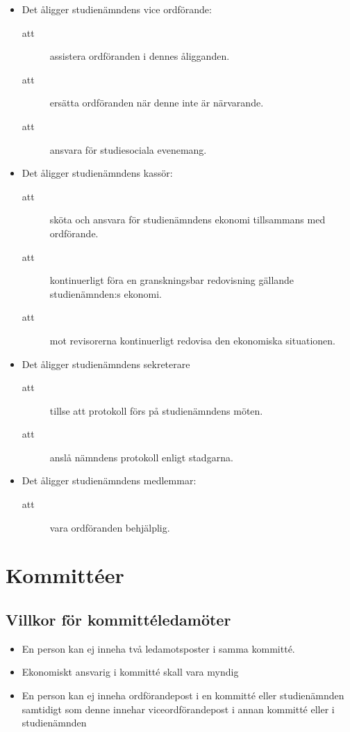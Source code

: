 \documentclass[11pt,a4paper]{article}
\begin{document}
\begin{itemize}
  \item Det åligger studienämndens vice ordförande:
    \begin{description}
      \item[att] assistera ordföranden i dennes åligganden.
      \item[att] ersätta ordföranden när denne inte är närvarande.
      \item[att] ansvara för studiesociala evenemang.
    \end{description}

  \item Det åligger studienämndens kassör:
    \begin{description}
      \item[att] sköta och ansvara för studienämndens ekonomi tillsammans med ordförande.
      \item[att] kontinuerligt föra en granskningsbar redovisning gällande studienämnden:s ekonomi.
      \item[att] mot revisorerna kontinuerligt redovisa den ekonomiska situationen. 
    \end{description}

	\vspace{5mm}
	
    
    \item Det åligger studienämndens sekreterare
     \begin{description}
         \item[att] tillse att protokoll förs på studienämndens möten.
    \item[att] anslå nämndens protokoll enligt stadgarna.
     \end{description}

  \item Det åligger studienämndens medlemmar:
    \begin{description}
      \item[att] vara ordföranden behjälplig.
    \end{description}

\end{itemize}


\newpage

\section{Kommittéer}

\subsection{Villkor för kommittéledamöter}
\begin{itemize}
\item En person kan ej inneha två ledamotsposter i samma kommitté.
\item Ekonomiskt ansvarig i kommitté skall vara myndig
\item En person kan ej inneha ordförandepost i en kommitté eller studienämnden samtidigt som denne innehar viceordförandepost i annan kommitté eller i studienämnden

\end{itemize}
\end{document}
